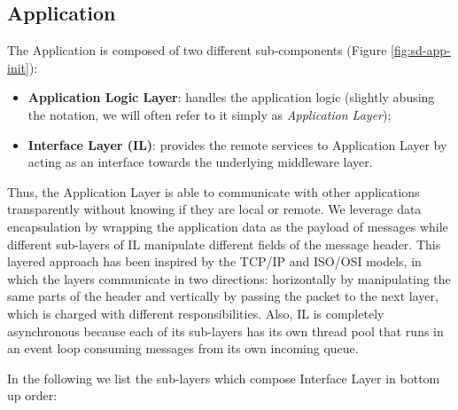 \subsection{Application}
The Application is composed of two different sub-components (Figure
\ref{fig:sd-app-init}):

\begin{itemize}
  \item \textbf{Application Logic Layer}: handles the application logic
    (slightly abusing the notation, we will often refer to it simply as
    \textit{Application Layer});
  \item \textbf{Interface Layer (IL)}: provides the remote services to Application
    Layer by acting as an interface towards the underlying middleware layer.
\end{itemize}

Thus, the Application Layer is able to communicate with other applications
transparently without knowing if they are local or remote. We leverage data
encapsulation by wrapping the application data as the payload of messages while
different sub-layers of IL manipulate different fields of the
message header.
This layered approach has been inspired by the TCP/IP and ISO/OSI models, in
which the layers communicate in two directions: horizontally by manipulating
the same parts of the header and vertically by passing the packet to the next
layer, which is charged with different responsibilities.
Also, IL is completely asynchronous because each of its sub-layers has its own
thread pool that runs in an event loop consuming messages from its own incoming
queue.

In the following we list the sub-layers which compose Interface Layer in
bottom up order:

